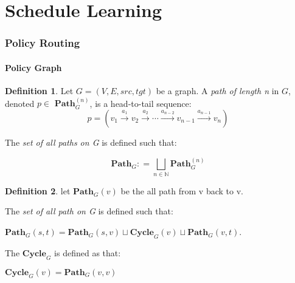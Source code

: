 \documentclass{article}
\theoremstyle{definition}
\newtheorem{definition}{Definition}[section]
\theoremstyle{remark}
\newcommand{\path}[2]{\mathbf{Path}^{#2}_{#1}}
\newcommand{\pathall}[1]{\mathbf{Path}_{#1}}
\newcommand{\cyclepath}[1]{\mathbf{Cycle}_{#1}}
\newcommand{\labeledarrow}[1]{\stackrel{#1}{\rightarrow}}
\begin{document}
	\part{Schedule Learning}
	
	\section{Policy Routing}
	
	\subsection{Policy Graph}
	
		\begin{definition} 
			Let $G = (V, E, src, tgt)$ be a graph. A \emph{path of length n} in $G$, denoted $p \in$ $\path{G}{(n)}$, is a head-to-tail sequence:
			\[
			p = (v_{1}   \labeledarrow{a_{1}}   v_{2}   \labeledarrow{a_{2}}  \cdots   \labeledarrow{a_{n-2}}  v_{n-1}   \labeledarrow{a_{n-1}}   v_{n})
			\]
			
			The \emph{set of all paths on G} is defined such that: 
			
			\[
			\pathall{G} : = \bigsqcup_{n \in \mathbb{N}}{\path{G}{(n)}}
			\]
		\end{definition}
		
		\begin{definition}
			let $\pathall{G}(v)$ be the all path from v back to v.
			
			The \emph{set of all path on G} is defined such that:
			
			$\pathall{G}(s,t) = \pathall{G}(s,v)\sqcup \cyclepath{G}(v) \sqcup \pathall{G}(v,t)$.
			
			The $\cyclepath{G}$ is defined as that:
			
			$\cyclepath{G}(v) = \pathall{G}(v,v)$
		\end{definition}
	
	\newpage    
	
\end{document}
